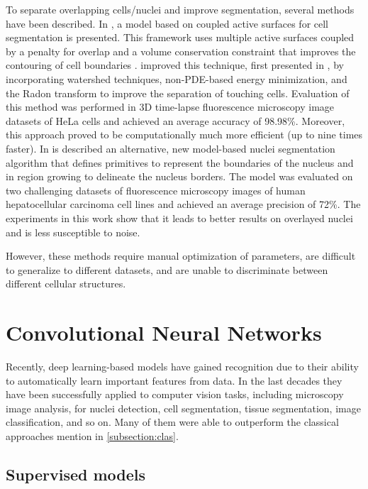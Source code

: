 To separate overlapping cells/nuclei and improve segmentation, several methods have been described. In \cite{active:couple}, a model based on coupled active surfaces for cell segmentation is presented. This framework uses multiple active surfaces coupled by a penalty for overlap and a volume conservation constraint that improves the contouring of cell boundaries \cite{couple:original}. \citet{active:couple} improved this technique, first presented in \cite{couple:original}, by incorporating watershed techniques, non-PDE-based energy minimization, and the Radon transform to improve the separation of touching cells. Evaluation of this method was performed in \ac{3D} time-lapse fluorescence microscopy image datasets of HeLa cells and achieved an average accuracy of 98.98\%. Moreover, this approach proved to be computationally much more efficient (up to nine times faster). In \cite{graphs} is described an alternative, new model-based nuclei segmentation algorithm that defines primitives to represent the boundaries of the nucleus and in region growing to delineate the nucleus borders. The model was evaluated on two challenging datasets of fluorescence microscopy images of human hepatocellular carcinoma cell lines and achieved an average precision of 72\%. The experiments in this work show that it leads to better results on overlayed nuclei and is less susceptible to noise.

However, these methods require manual optimization of parameters, are difficult to generalize to different datasets, and are unable to discriminate between different cellular structures. 
 
\section{Convolutional Neural Networks}

Recently, deep learning-based models have gained recognition due to their ability to automatically learn important features from data. In the last decades they have been successfully applied to computer vision tasks, including microscopy image analysis, for nuclei detection, cell segmentation, tissue segmentation, image classification, and so on. Many of them were able to outperform the classical approaches mention in \ref{subsection:clas}.

\subsection{Supervised models}

